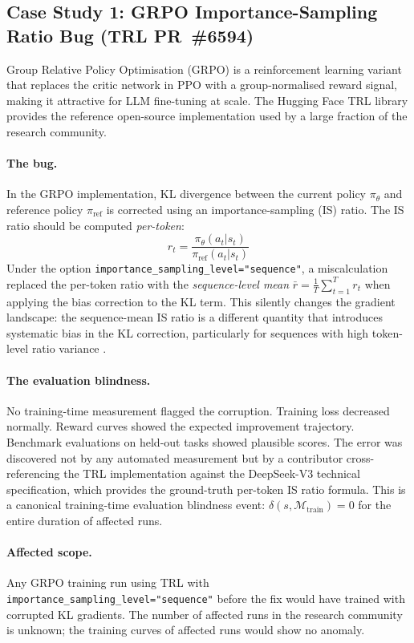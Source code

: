\documentclass{article}
\begin{document}
\subsection{Case Study 1: GRPO Importance-Sampling Ratio Bug (TRL PR~\#6594)}

Group Relative Policy Optimisation (GRPO) \citep{shao2024deepseekmath} is a
reinforcement learning variant that replaces the critic network in PPO with
a group-normalised reward signal, making it attractive for LLM fine-tuning
at scale.  The Hugging Face TRL library provides the reference open-source
implementation used by a large fraction of the research community.

\paragraph{The bug.}
In the GRPO implementation, KL divergence between the current policy $\pi_\theta$
and reference policy $\pi_{\text{ref}}$ is corrected using an
importance-sampling (IS) ratio.  The IS ratio should be computed
\emph{per-token}:
\[
  r_t = \frac{\pi_\theta(a_t | s_t)}{\pi_{\text{ref}}(a_t | s_t)}
\]
Under the option \texttt{importance\_sampling\_level="sequence"}, a
miscalculation replaced the per-token ratio with the \emph{sequence-level mean}
$\bar{r} = \frac{1}{T} \sum_{t=1}^{T} r_t$ when applying the bias correction
to the KL term.  This silently changes the gradient landscape: the sequence-mean
IS ratio is a different quantity that introduces systematic bias in the KL
correction, particularly for sequences with high token-level ratio variance
\citep{trl2024grpo}.

\paragraph{The evaluation blindness.}
No training-time measurement flagged the corruption.  Training loss decreased
normally.  Reward curves showed the expected improvement trajectory.  Benchmark
evaluations on held-out tasks showed plausible scores.  The error was discovered
not by any automated measurement but by a contributor cross-referencing the TRL
implementation against the DeepSeek-V3 technical specification, which provides
the ground-truth per-token IS ratio formula.  This is a canonical training-time
evaluation blindness event: $\delta(s, \mathcal{M}_{\text{train}}) = 0$ for
the entire duration of affected runs.

\paragraph{Affected scope.}
Any GRPO training run using TRL with
\texttt{importance\_sampling\_level="sequence"} before the fix would have
trained with corrupted KL gradients.  The number of affected runs in the
research community is unknown; the training curves of affected runs would
show no anomaly.
\end{document}
